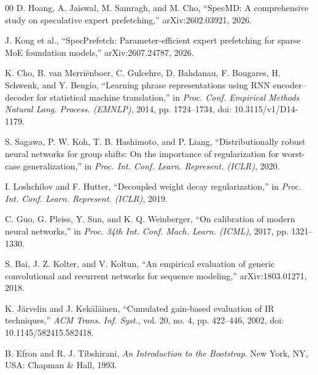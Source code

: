 \documentclass[conference]{IEEEtran}
\begin{document}
\begin{thebibliography}{00}
 D. Hoang, A. Jaiswal, M. Samragh, and M. Cho, ``SpecMD: A
comprehensive study on speculative expert prefetching,'' arXiv:2602.03921,
2026.

 J. Kong et al., ``SpecPrefetch: Parameter-efficient
expert prefetching for sparse MoE foundation models,'' arXiv:2607.24787,
2026.

 K. Cho, B. van Merri\"enboer, C. Gulcehre, D. Bahdanau,
F. Bougares, H. Schwenk, and Y. Bengio, ``Learning phrase representations
using RNN encoder--decoder for statistical machine translation,'' in
\emph{Proc. Conf. Empirical Methods Natural Lang. Process. (EMNLP)}, 2014,
pp. 1724--1734, doi: 10.3115/v1/D14-1179.

 S. Sagawa, P. W. Koh, T. B. Hashimoto, and P. Liang,
``Distributionally robust neural networks for group shifts: On the importance
of regularization for worst-case generalization,'' in \emph{Proc. Int. Conf.
Learn. Represent. (ICLR)}, 2020.

 I. Loshchilov and F. Hutter, ``Decoupled weight
decay regularization,'' in \emph{Proc. Int. Conf. Learn. Represent. (ICLR)},
2019.

 C. Guo, G. Pleiss, Y. Sun, and K. Q. Weinberger, ``On
calibration of modern neural networks,'' in \emph{Proc. 34th Int. Conf. Mach.
Learn. (ICML)}, 2017, pp. 1321--1330.

 S. Bai, J. Z. Kolter, and V. Koltun, ``An empirical
evaluation of generic convolutional and recurrent networks for sequence
modeling,'' arXiv:1803.01271, 2018.

 K. J\"arvelin and J. Kek\"al\"ainen, ``Cumulated
gain-based evaluation of IR techniques,'' \emph{ACM Trans. Inf. Syst.},
vol. 20, no. 4, pp. 422--446, 2002,
doi: 10.1145/582415.582418.

 B. Efron and R. J. Tibshirani, \emph{An Introduction to
the Bootstrap}. New York, NY, USA: Chapman \& Hall, 1993.
\end{thebibliography}
\end{document}
